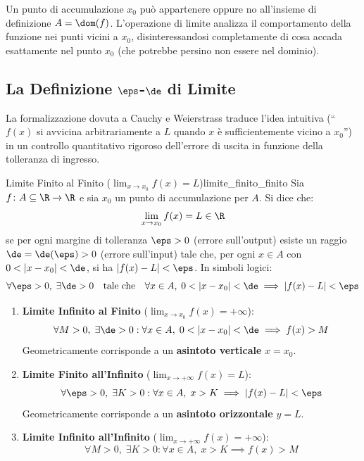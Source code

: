 \begin{osservazione}
Un punto di accumulazione $x_0$ può appartenere oppure no all'insieme di definizione $A = \dom(f)$. L'operazione di limite analizza il comportamento della funzione nei punti vicini a $x_0$, disinteressandosi completamente di cosa accada esattamente nel punto $x_0$ (che potrebbe persino non essere nel dominio).
\end{osservazione}

\subsection{La Definizione \texorpdfstring{$\eps$-$\de$}{Epsilon-Delta} di Limite}
La formalizzazione dovuta a Cauchy e Weierstrass traduce l'idea intuitiva (``$f(x)$ si avvicina arbitrariamente a $L$ quando $x$ è sufficientemente vicino a $x_0$'') in un controllo quantitativo rigoroso dell'errore di uscita in funzione della tolleranza di ingresso.

\begin{definizione}{Limite Finito al Finito ($\lim_{x \to x_0} f(x) = L$)}{limite_finito_finito}
Sia $f \colon A \subseteq \R \to \R$ e sia $x_0$ un punto di accumulazione per $A$. Si dice che:
\[
    \lim_{x \to x_0} f(x) = L \in \R
\]
se per ogni margine di tolleranza $\eps > 0$ (errore sull'output) esiste un raggio $\de = \de(\eps) > 0$ (errore sull'input) tale che, per ogni $x \in A$ con $0 < |x - x_0| < \de$, si ha $|f(x) - L| < \eps$. In simboli logici:
\[
    \forall \eps > 0, \; \exists \de > 0 \quad \text{tale che} \quad \forall x \in A, \; 0 < |x - x_0| < \de \implies |f(x) - L| < \eps
\]
\end{definizione}

\begin{metodo}
\begin{enumerate}
    \item \textbf{Limite Infinito al Finito} ($\lim_{x \to x_0} f(x) = +\infty$):
    \[
        \forall M > 0, \; \exists \de > 0 : \forall x \in A, \; 0 < |x - x_0| < \de \implies f(x) > M
    \]
    Geometricamente corrisponde a un \textbf{asintoto verticale} $x = x_0$.
    \item \textbf{Limite Finito all'Infinito} ($\lim_{x \to +\infty} f(x) = L$):
    \[
        \forall \eps > 0, \; \exists K > 0 : \forall x \in A, \; x > K \implies |f(x) - L| < \eps
    \]
    Geometricamente corrisponde a un \textbf{asintoto orizzontale} $y = L$.
    \item \textbf{Limite Infinito all'Infinito} ($\lim_{x \to +\infty} f(x) = +\infty$):
    \[
        \forall M > 0, \; \exists K > 0 : \forall x \in A, \; x > K \implies f(x) > M
    \]
\end{enumerate}
\end{metodo}

